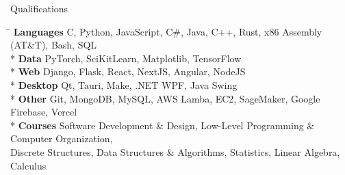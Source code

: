 \documentclass{article}
\newlength{\secsep}
\newenvironment{tabbedsection}[1]{
  \begin{list}{}{
      \setlength{\itemsep}{0pt}
      \setlength{\labelsep}{0pt}
      \setlength{\labelwidth}{0pt}
      \setlength{\leftmargin}{0pt}
      \setlength{\rightmargin}{0pt}
      \setlength{\listparindent}{0pt}
      \setlength{\parsep}{0pt}
      \setlength{\parskip}{0pt}
      \setlength{\partopsep}{0pt}
      \setlength{\topsep}{#1}
    }
  \item[]
}{\end{list}}
\newenvironment{nospacetabbing}{
    \begin{tabbing}
}{\end{tabbing}\vspace{-1.6pt}}
\newenvironment{resume_section}[1]{
  \filbreak
  \vspace{\secsep}
  {\color {MyDarkBlue}\textbf {\underline{#1}}}
  \begin{tabbedsection}{\secsep}
}{\end{tabbedsection}}
\begin{document}
\begin{resume_section}{Qualifications}
  \begin {nospacetabbing}
      \hspace{2.5cm} \= \kill
      \textbf{Languages} \>C, Python, JavaScript, C\#, Java, C++, Rust, x86 Assembly (AT\&T), Bash, SQL\\* 
      \textbf{Data} \> PyTorch, SciKitLearn, Matplotlib, TensorFlow\\*
      \textbf{Web} \> Django, Flask, React, NextJS, Angular, NodeJS\\*
      \textbf{Desktop} \> Qt, Tauri, Make, .NET WPF, Java Swing\\*
      \textbf{Other} \> Git, MongoDB, MySQL, AWS Lamba, EC2, SageMaker, Google Firebase, Vercel \\*
      \textbf{Courses} \> Software Development \& Design, Low-Level Programming \& Computer Organization, \\
      \> Discrete Structures, Data Structures \& Algorithms, Statistics, Linear Algebra, Calculus
  \end {nospacetabbing}
\end{resume_section}
\end{document}
